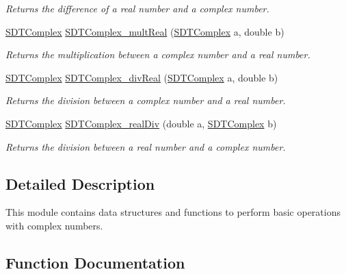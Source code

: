 \begin{DoxyCompactItemize}
\begin{DoxyCompactList}\small\item\em Returns the difference of a real number and a complex number. \end{DoxyCompactList}\item 
\hyperlink{struct_s_d_t_complex}{S\+D\+T\+Complex} \hyperlink{group__complex_ga62b4c54b79fd962a1607de8d39cd85d4}{S\+D\+T\+Complex\+\_\+mult\+Real} (\hyperlink{struct_s_d_t_complex}{S\+D\+T\+Complex} a, double b)
\begin{DoxyCompactList}\small\item\em Returns the multiplication between a complex number and a real number. \end{DoxyCompactList}\item 
\hyperlink{struct_s_d_t_complex}{S\+D\+T\+Complex} \hyperlink{group__complex_ga0c324c5f1d759ec1bd1039193eb6f738}{S\+D\+T\+Complex\+\_\+div\+Real} (\hyperlink{struct_s_d_t_complex}{S\+D\+T\+Complex} a, double b)
\begin{DoxyCompactList}\small\item\em Returns the division between a complex number and a real number. \end{DoxyCompactList}\item 
\hyperlink{struct_s_d_t_complex}{S\+D\+T\+Complex} \hyperlink{group__complex_ga6f26e1b8e14b15bf49ca42aa0a44b5be}{S\+D\+T\+Complex\+\_\+real\+Div} (double a, \hyperlink{struct_s_d_t_complex}{S\+D\+T\+Complex} b)
\begin{DoxyCompactList}\small\item\em Returns the division between a real number and a complex number. \end{DoxyCompactList}\end{DoxyCompactItemize}


\subsection{Detailed Description}
This module contains data structures and functions to perform basic operations with complex numbers. 

\subsection{Function Documentation}
\hypertarget{group__complex_gabacc30ac0cc7bf106ba1319c621f20be}{}
